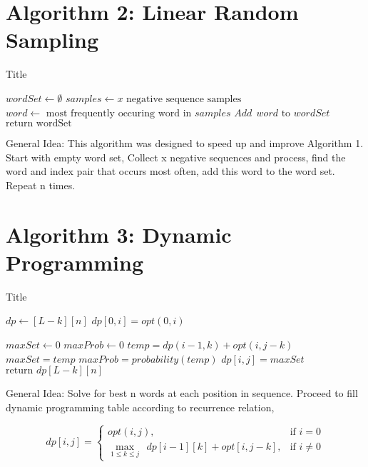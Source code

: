 \documentclass[12pt]{article}
\begin{document}
\section{Algorithm 2: Linear Random Sampling}

\begin{algorithm}
\caption{Title}\label{euclid}
\begin{algorithmic}[1]
\State $wordSet \leftarrow \emptyset$
\State $samples \leftarrow x \text{ negative sequence samples}$
\State $word \leftarrow \text{ most frequently occuring word in } samples$
\State $Add \:\: word \text{ to } wordSet$
\EndFor
\State $\text{return wordSet}$
\end{algorithmic}
\end{algorithm}

General Idea: This algorithm was designed to speed up and improve Algorithm 1. Start with empty word set, Collect x negative sequences and process, find the word and index pair that occurs most often, add this word to the word set. Repeat n times.

\pagebreak

\section{Algorithm 3: Dynamic Programming}

\begin{algorithm}
\caption{Title}\label{euclid}
\begin{algorithmic}[1]
\State $dp \leftarrow [L-k][n]$
\State $dp[0,i] = opt(0,i) $
\EndFor

\State $maxSet \leftarrow 0$
\State $maxProb \leftarrow 0$
\State $temp = dp(i-1,k)+opt(i,j-k)$
\State $maxSet = temp$
\State $maxProb = probability(temp)$
\EndIf
\EndFor
\State $dp[i,j] = maxSet$
\EndFor
\EndFor
\State $\text{return } dp[L-k][n]$


\end{algorithmic}
\end{algorithm}

General Idea: Solve for best n words at each position in sequence. Proceed to fill dynamic programming table according to recurrence relation,

$$dp[i,j] = \begin{cases} opt(i,j), & \mbox{if } i = 0 \\ \underset{1 \leq k \leq j}{\operatorname{max}} \:\:  dp[i-1][k] + opt[i,j-k] , & \mbox{if } i \neq 0\end{cases}$$
\end{document}
